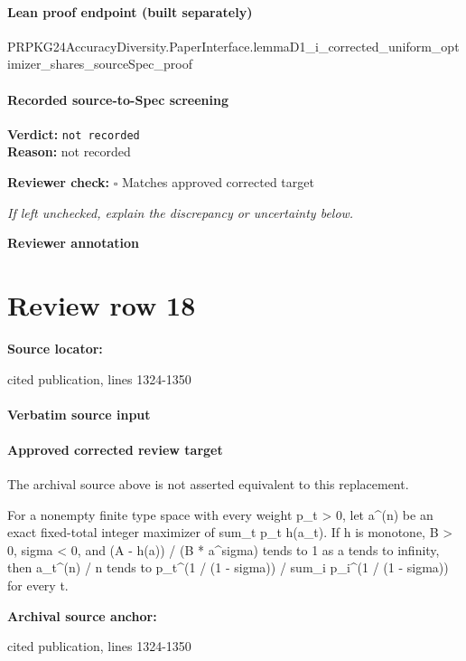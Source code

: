 \documentclass[10pt]{article}
\newcommand{\reviewerbox}{%
  \par\noindent\fbox{\parbox{0.96\linewidth}{\rule{0pt}{0.38in}}}\par
}
\newcommand{\reviewmatch}[1]{%
  \par\noindent\textbf{Reviewer check:} $\square$\; #1\par
  \noindent\emph{If left unchecked, explain the discrepancy or uncertainty below.}\par
}
\begin{document}
\paragraph{Lean proof endpoint (built separately)}\begin{ReviewVerbatim}
PRPKG24AccuracyDiversity.PaperInterface.lemmaD1_i_corrected_uniform_optimizer_shares_sourceSpec_proof
\end{ReviewVerbatim}

\paragraph{Recorded source-to-Spec screening}
\textbf{Verdict:} \texttt{not recorded}
\\
\textbf{Reason:} not recorded
\reviewmatch{Matches approved corrected target}
\noindent\textbf{Reviewer annotation}\par
\reviewerbox
\clearpage
\hypertarget{source-claim-f95d0c81ab1b47f3}{}
\section*{Review row 18}
\textbf{Source locator:} {\footnotesize\raggedright cited publication, lines 1324-\allowbreak{}1350\par}
\paragraph{Verbatim source input}
\begin{ReviewVerbatim}
\end{ReviewVerbatim}

\paragraph{Approved corrected review target}
The archival source above is not asserted equivalent to this replacement.
\begin{ReviewVerbatim}
For a nonempty finite type space with every weight p_t > 0, let a^(n) be an exact fixed-total integer maximizer of sum_t p_t h(a_t). If h is monotone, B > 0, sigma < 0, and (A - h(a)) / (B * a^sigma) tends to 1 as a tends to infinity, then a_t^(n) / n tends to p_t^(1 / (1 - sigma)) / sum_i p_i^(1 / (1 - sigma)) for every t.
\end{ReviewVerbatim}

\textbf{Archival source anchor:} {\footnotesize\raggedright cited publication, lines 1324-\allowbreak{}1350\par}
\end{document}
